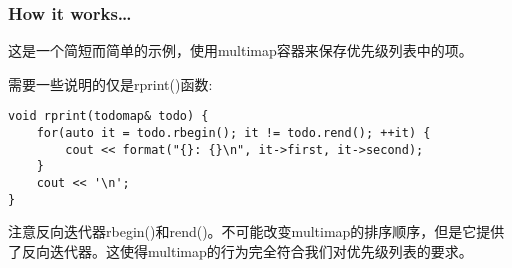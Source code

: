 \subsubsection{How it works…}

这是一个简短而简单的示例，使用multimap容器来保存优先级列表中的项。

需要一些说明的仅是rprint()函数:

\begin{lstlisting}[style=styleCXX]
void rprint(todomap& todo) {
	for(auto it = todo.rbegin(); it != todo.rend(); ++it) {
		cout << format("{}: {}\n", it->first, it->second);
	}
	cout << '\n';
}
\end{lstlisting}

注意反向迭代器rbegin()和rend()。不可能改变multimap的排序顺序，但是它提供了反向迭代器。这使得multimap的行为完全符合我们对优先级列表的要求。




